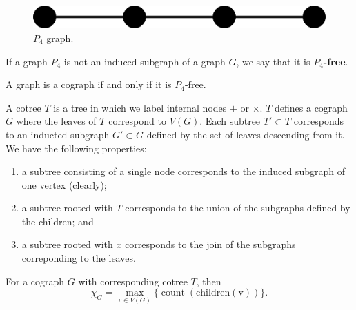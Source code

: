 \begin{figure}
    \centering
    \includegraphics[width=0.8\linewidth]{images/p4.png}
    \caption{$P_4$ graph.}
    \label{fig:p4}
\end{figure}

If a graph $P_4$ is not an induced subgraph of a graph $G$, we say that it is \textbf{$P_4$-free}.

\begin{theorem}[]
    A graph is a cograph if and only if it is $P_4$-free.
\end{theorem}

\begin{definition}[Cotree]
    A cotree $T$ is a tree in which we label internal nodes $+$ or $\times$. $T$ defines a cograph $G$ where the leaves of $T$ correspond to $V(G)$. 
    Each subtree $T' \subset T$ corresponds to an inducted subgraph $G' \subset G$ defined by the set of leaves descending from it. 
    We have the following properties:
    \begin{enumerate}
        \item a subtree consisting of a single node corresponds to the induced subgraph of one vertex (clearly);
        \item a subtree rooted with $T$ corresponds to the union of the subgraphs defined by the children; and
        \item a subtree rooted with $x$ corresponds to the join of the subgraphs correponding to the leaves.
    \end{enumerate}
\end{definition}

\begin{proposition}[]
    For a cograph $G$ with corresponding cotree $T$, then
    \[ \chi_G = \max_{v \in V(G)}\{\operatorname{count}{(\operatorname{children{(v)}})}\}. \] 
\end{proposition}

